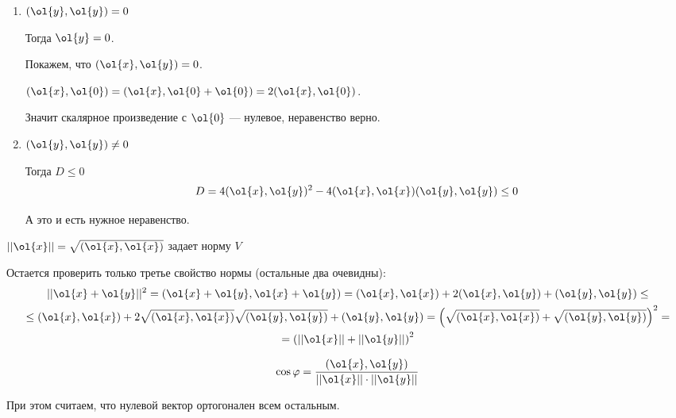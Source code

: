 \begin{enumerate}
    \item
        \( (\ol{y}, \ol{y}) = 0 \)

        Тогда \( \ol{y} = 0 \).

        Покажем, что \( (\ol{x}, \ol{y}) = 0 \).

        \( (\ol{x}, \ol{0}) = (\ol{x}, \ol{0} + \ol{0}) = 2 (\ol{x}, \ol{0}) \).

        Значит скалярное произведение с \( \ol{0} \) --- нулевое,
        неравенство верно.
    \item
        \( (\ol{y}, \ol{y}) \neq 0 \)

        Тогда \( D \leq 0 \)
        \[
            D = 4 (\ol{x}, \ol{y})^2 - 4(\ol{x}, \ol{x})(\ol{y}, \ol{y}) \leq 0
        \]

        А это и есть нужное неравенство.
\end{enumerate}

\newpage

\begin{thrm}{}{}
    \( || \ol{x} || = \sqrt{(\ol{x}, \ol{x})} \) задает норму \( V \)
\end{thrm}

Остается проверить только третье свойство нормы (остальные два очевидны):
\begin{gather*}
    || \ol{x} + \ol{y} ||^2 = (\ol{x} + \ol{y}, \ol{x} + \ol{y}) = (\ol{x}, \ol{x}) + 2(\ol{x}, \ol{y}) + (\ol{y}, \ol{y})
    \leq
    \\
    \leq
    (\ol{x}, \ol{x}) + 2 \sqrt{(\ol{x}, \ol{x})} \sqrt{(\ol{y}, \ol{y})} + (\ol{y}, \ol{y})
    =
    \left( \sqrt{(\ol{x}, \ol{x})} + \sqrt{(\ol{y}, \ol{y})} \right)^2
    =
    \\
    =
    \left( || \ol{x} || + || \ol{y} || \right)^2
\end{gather*}

\begin{defn}{}{}
    \[
        \cos \varphi = \frac{(\ol{x}, \ol{y})}{||\ol{x}|| \cdot ||\ol{y}||}
    \]

    При этом считаем, что нулевой вектор ортогонален всем остальным.
\end{defn}

